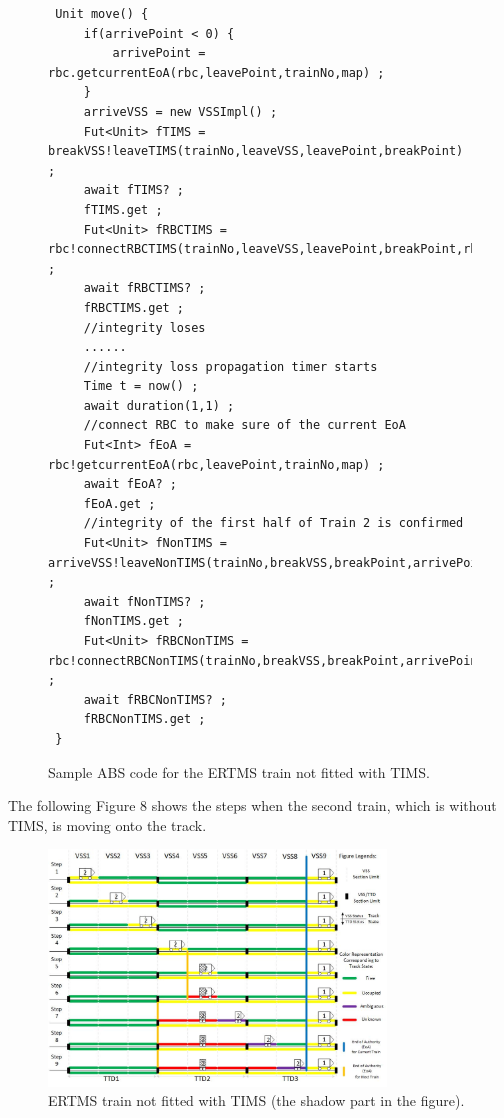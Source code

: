 \documentclass[article,dr=phil,type=msc,colorback,accentcolor=tud9c]{tudthesis}
\begin{document}
  \begin{figure}[H]
	\begin{lstlisting}
 Unit move() {
	 if(arrivePoint < 0) {
 		 arrivePoint = rbc.getcurrentEoA(rbc,leavePoint,trainNo,map) ;
 	 }
	 arriveVSS = new VSSImpl() ;
	 Fut<Unit> fTIMS = breakVSS!leaveTIMS(trainNo,leaveVSS,leavePoint,breakPoint) ;
	 await fTIMS? ;
	 fTIMS.get ;
	 Fut<Unit> fRBCTIMS = rbc!connectRBCTIMS(trainNo,leaveVSS,leavePoint,breakPoint,rbc,map) ;
	 await fRBCTIMS? ;
	 fRBCTIMS.get ;
	 //integrity loses
	 ......	
	 //integrity loss propagation timer starts
	 Time t = now() ;
	 await duration(1,1) ;
	 //connect RBC to make sure of the current EoA
	 Fut<Int> fEoA = rbc!getcurrentEoA(rbc,leavePoint,trainNo,map) ;
	 await fEoA? ;
	 fEoA.get ;
	 //integrity of the first half of Train 2 is confirmed
	 Fut<Unit> fNonTIMS = arriveVSS!leaveNonTIMS(trainNo,breakVSS,breakPoint,arrivePoint) ;
	 await fNonTIMS? ;
	 fNonTIMS.get ;
	 Fut<Unit> fRBCNonTIMS = rbc!connectRBCNonTIMS(trainNo,breakVSS,breakPoint,arrivePoint,rbc,map) ;
	 await fRBCNonTIMS? ;
	 fRBCNonTIMS.get ;   
 }\end{lstlisting}
	\caption[Caption for LOF]{Sample ABS code for the ERTMS train not fitted with TIMS.}
  \end{figure}
    
  The following Figure 8 shows the steps when the second train, which is without TIMS, is moving onto the track.
    
  \begin{figure}[H]
	\begin{center}
		\includegraphics[width=0.8\textwidth]{train2}
		\caption[Caption for LOF]{ERTMS train not fitted with TIMS (the shadow part in the figure).}
	\end{center}
  \end{figure}
\end{document}
